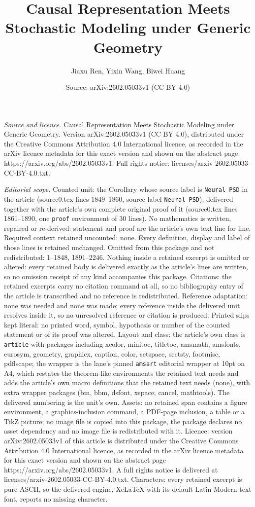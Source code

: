 \documentclass[10pt,a4paper]{amsart}
\title[Causal Representation Meets Stochastic Modeling under Generi]{Causal Representation Meets Stochastic Modeling under Generic Geometry}
\author{Jiaxu Ren, Yixin Wang, Biwei Huang}
\date{Source: arXiv:2602.05033v1 (CC BY 4.0)}
\begin{document}
\maketitle

\noindent\emph{Source and licence.} Causal Representation Meets Stochastic Modeling under Generic Geometry. Version arXiv:2602.05033v1 (CC BY 4.0), distributed under the Creative Commons Attribution 4.0 International licence, as recorded in the arXiv licence metadata for this exact version and shown on the abstract page https://arxiv.org/abs/2602.05033v1. Full rights notice: licenses/arxiv-2602.05033-CC-BY-4.0.txt.\par\smallskip

\noindent\textit{Editorial scope.} Counted unit: the Corollary whose source label is \texttt{Neural PSD} in the article (source0.tex lines 1849--1860, source label \texttt{Neural PSD}), delivered together with the article's own complete original proof of it (source0.tex lines 1861--1890, one \texttt{proof} environment of 30 lines). No mathematics is written, repaired or re-derived: statement and proof are the article's own text line for line. Required context retained uncounted: none. Every definition, display and label of those lines is retained unchanged. Omitted from this package and not redistributed: 1--1848, 1891--2246. Nothing inside a retained excerpt is omitted or altered: every retained body is delivered exactly as the article's lines are written, so no omission receipt of any kind accompanies this package. Citations: the retained excerpts carry no citation command at all, so no bibliography entry of the article is transcribed and no reference is redistributed. Reference adaptation: none was needed and none was made; every reference inside the delivered unit resolves inside it, so no unresolved reference or citation is produced. Printed slips kept literal: no printed word, symbol, hypothesis or number of the counted statement or of its proof was altered. Layout and class: the article's own class is \texttt{article} with packages including xcolor, minitoc, titletoc, amsmath, amsfonts, eurosym, geometry, graphicx, caption, color, setspace, sectsty, footmisc, pdflscape; the wrapper is the lane's pinned \texttt{amsart} editorial wrapper at 10pt on A4, which restates the theorem-like environments the retained text needs and adds the article's own macro definitions that the retained text needs (none), with extra wrapper packages (bm, bbm, dsfont, xspace, cancel, mathtools). The delivered numbering is the unit's own. Assets: no retained span contains a figure environment, a graphics-inclusion command, a PDF-page inclusion, a table or a TikZ picture; no image file is copied into this package, the package declares no asset dependency and no image file is redistributed with it. Licence: version arXiv:2602.05033v1 of this article is distributed under the Creative Commons Attribution 4.0 International licence, as recorded in the arXiv licence metadata for this exact version and shown on the abstract page https://arxiv.org/abs/2602.05033v1. A full rights notice is delivered at licenses/arxiv-2602.05033-CC-BY-4.0.txt. Characters: every retained excerpt is pure ASCII, so the delivered engine, XeLaTeX with its default Latin Modern text font, reports no missing character.
\end{document}
